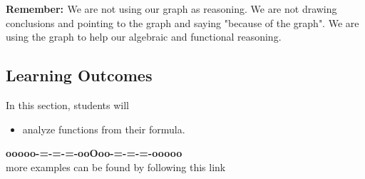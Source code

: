\documentclass{ximera}
\begin{document}
\textbf{\textcolor{red!80!black}{Remember: }}  We are not using our graph as reasoning.  We are not drawing conclusions and pointing to the graph and saying "because of the graph".  We are using the graph to help our algebraic and functional reasoning.


\subsection*{Learning Outcomes}


\begin{sectionOutcomes}
In this section, students will 

\begin{itemize}
\item analyze functions from their formula.
\end{itemize}
\end{sectionOutcomes}











\begin{center}
\textbf{\textcolor{green!50!black}{ooooo-=-=-=-ooOoo-=-=-=-ooooo}} \\

more examples can be found by following this link\\ 

\end{center}
\end{document}
